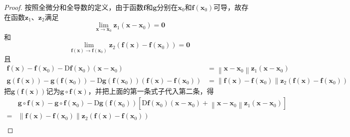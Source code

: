 \documentclass[../main.tex]{subfiles}
\begin{document}
\begin{proof}
    按照全微分和全导数的定义，由于函数$\mathbf{f}$和$\mathbf{g}$分别在$\mathbf{x}_0$和$\mathbf{f}\left(\mathbf{x}_0\right)$可导，故存在函数$\mathbf{z}_1$、$\mathbf{z}_2$满足
    \[\lim_{\mathbf{x}\to\mathbf{x}_0}\mathbf{z}_1\left(\mathbf{x}-\mathbf{x}_0\right)=\mathbf{0}\]
    和
    \[\lim_{\mathbf{f}\left(\mathbf{x}\right)\to\mathbf{f}\left(\mathbf{x}_0\right)}\mathbf{z}_2\left(\mathbf{f}\left(\mathbf{x}\right)-\mathbf{f}\left(\mathbf{x}_0\right)\right)=\mathbf{0}\]
    且
    \begin{align*}
        \mathbf{f}\left(\mathbf{x}\right)-\mathbf{f}\left(\mathbf{x}_0\right)-\mathrm{D}\mathbf{f}\left(\mathbf{x}_0\right)\left(\mathbf{x}-\mathbf{x}_0\right)                                                                                                                    & =\left\|\mathbf{x}-\mathbf{x}_0\right\|\mathbf{z}_1\left(\mathbf{x}-\mathbf{x}_0\right)                                                                                             \\
        \mathbf{g}\left(\mathbf{f}\left(\mathbf{x}\right)\right)-\mathbf{g}\left(\mathbf{f}\left(\mathbf{x}_0\right)\right)-\mathrm{D}\mathbf{g}\left(\mathbf{f}\left(\mathbf{x}_0\right)\right)\left(\mathbf{f}\left(\mathbf{x}\right)-\mathbf{f}\left(\mathbf{x}_0\right)\right) & =\left\|\mathbf{f}\left(\mathbf{x}\right)-\mathbf{f}\left(\mathbf{x}_0\right)\right\|\mathbf{z}_2\left(\mathbf{f}\left(\mathbf{x}\right)-\mathbf{f}\left(\mathbf{x}_0\right)\right)
    \end{align*}
    把$\mathbf{g}\left(\mathbf{f}\left(\mathbf{x}\right)\right)$记为$\mathbf{g}\circ\mathbf{f}\left(\mathbf{x}\right)$，并把上面的第一条式子代入第二条，得
    \begin{align*}
                        & \mathbf{g}\circ\mathbf{f}\left(\mathbf{x}\right)-\mathbf{g}\circ\mathbf{f}\left(\mathbf{x}_0\right)-\mathrm{D}\mathbf{g}\left(\mathbf{f}\left(\mathbf{x}_0\right)\right)\left[\mathrm{D}\mathbf{f}\left(\mathbf{x}_0\right)\left(\mathbf{x}-\mathbf{x}_0\right)+\left\|\mathbf{x}-\mathbf{x}_0\right\|\mathbf{z}_1\left(\mathbf{x}-\mathbf{x}_0\right)\right] \\
        =               & \left\|\mathbf{f}\left(\mathbf{x}\right)-\mathbf{f}\left(\mathbf{x}_0\right)\right\|\mathbf{z}_2\left(\mathbf{f}\left(\mathbf{x}\right)-\mathbf{f}\left(\mathbf{x}_0\right)\right)                                                                                                                                                                            \\

\end{align*}
\end{proof}
\end{document}
